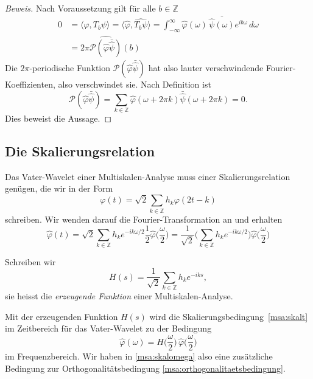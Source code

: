 \begin{proof}[Beweis]
Nach Voraussetzung gilt für alle $b\in\mathbb Z$
\begin{align*}
0
&=
\langle \varphi,T_b\psi\rangle
=
\langle \hat{\varphi}, \widehat{T_b\psi}\rangle
=
\int_{-\infty}^\infty
\hat{\varphi}(\omega)\, \overline{\hat{\psi}(\omega)} e^{ib\omega}
\,d\omega
\\
&=
2\pi
\widehat{\mathcal{P}(\hat{\varphi}\bar{\hat{\psi}})}(b)
\end{align*}
Die $2\pi$-periodische Funktion $\mathcal{P}(\hat{\varphi}\bar{\hat{\psi}})$ 
hat also lauter verschwindende Fourier-Koeffizienten, also verschwindet
sie.
Nach Definition ist
\[
\mathcal{P}(\hat{\varphi}\bar{\hat{\psi}})
=
\sum_{k\in\mathbb Z}
\hat{\varphi}(\omega + 2\pi k)
\bar{\hat{\psi}}(\omega + 2\pi k)
=0.
\]
Dies beweist die Aussage.
\end{proof}

%
%
\subsection{Die Skalierungsrelation}
Das Vater-Wavelet einer Multiskalen-Analyse muss einer Skalierungsrelation
genügen, die wir in der Form
\begin{equation}
\varphi(t)
=
\sqrt{2} \sum_{k\in\mathbb Z} h_k \varphi(2t-k)
\label{msa:skalt}
\end{equation}
schreiben.
Wir wenden darauf die Fourier-Transformation an und erhalten
\[
\hat{\varphi}(t)
=
\sqrt{2} \sum_{k\in\mathbb Z} h_k e^{-ik\omega/2} \frac12\hat{\varphi}\biggl(\frac{\omega}{2}\biggr)
=
\frac1{\sqrt{2}}
\biggl(\sum_{k\in\mathbb Z}h_ke^{-ik\omega/2}\biggr)
\hat{\varphi}\biggl(\frac{\omega}2\biggr)
\]

\begin{definition}
Schreiben wir 
\[
H(s)
=
\frac1{\sqrt{2}}
\sum_{k\in\mathbb Z}h_ke^{-iks},
\]
sie heisst die {\em erzeugende Funktion} einer Multiskalen-Analyse.
\end{definition}

Mit der erzeugenden Funktion $H(s)$ wird die
Skalierungsbedingung~\eqref{msa:skalt} im Zeitbereich
für das Vater-Wavelet zu der Bedingung
\begin{equation}
\hat{\varphi}(\omega) 
=
H\biggl(\frac{\omega}2\biggr)\,\hat{\varphi}\biggl(\frac{\omega}2\biggr)
\label{msa:skalomega}
\end{equation}
im Frequenzbereich.
Wir haben in \eqref{msa:skalomega}
also eine zusätzliche Bedingung zur Orthogonalitätsbedingung
\eqref{msa:orthogonalitaetsbedingung}.

